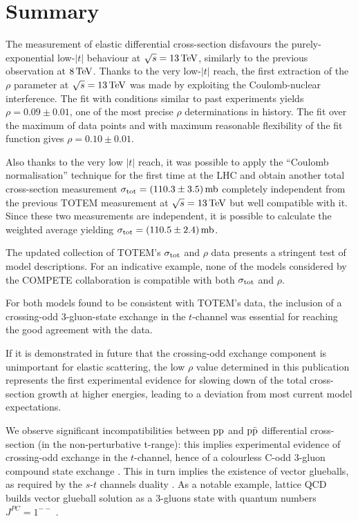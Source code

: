 \section{Summary}
\label{sec:summary}

The measurement of elastic differential cross-section disfavours the purely-exponential low-$|t|$ behaviour at $\sqrt s = 13\,{\rm TeV}$, similarly to the previous observation at $8\,{\rm TeV}$. Thanks to the very low-$|t|$ reach, the first extraction of the $\rho$ parameter at $\sqrt s = 13\,{\rm TeV}$ was made by exploiting the Coulomb-nuclear interference. The fit with conditions similar to past experiments yields $\rho = 0.09 \pm 0.01$, one of the most precise $\rho$ determinations in history. The fit over the maximum of data points and with maximum reasonable flexibility of the fit function gives $\rho = 0.10 \pm 0.01$.

Also thanks to the very low $|t|$ reach, it was possible to apply the ``Coulomb normalisation'' technique for the first time at the LHC and obtain another total cross-section measurement $\sigma_{\rm tot} = (110.3 \pm 3.5)\,{\rm mb}$ completely independent from the previous TOTEM measurement at $\sqrt s = 13\,{\rm TeV}$ \cite{totem-13tev-90m} but well compatible with it. Since these two measurements are independent, it is possible to calculate the weighted average yielding $\sigma_{\rm tot} = (110.5 \pm 2.4)\,{\rm mb}$.

The updated collection of TOTEM's $\sigma_{\rm tot}$ and $\rho$ data presents a stringent test of model descriptions. For an indicative example, none of the models considered by the COMPETE collaboration is compatible with both $\sigma_{\rm tot}$ and $\rho$.

For both models found to be consistent with TOTEM's data, the inclusion of a crossing-odd 3-gluon-state exchange in the $t$-channel was essential for reaching the good agreement with the data.

If it is demonstrated in future that the crossing-odd exchange component is unimportant for elastic scattering, the low $\rho$ value determined in this publication represents the first experimental evidence for slowing down of the total cross-section growth at higher energies, leading to a deviation from most current model expectations.

We observe significant incompatibilities between $\rm pp$ and $\rm p \bar p$ differential cross-section (in the non-perturbative t-range): this implies experimental evidence of crossing-odd exchange in the $t$-channel, hence of a colourless C-odd 3-gluon compound state exchange \cite{bartels-2000,bartels-2001}. This in turn implies the existence of vector glueballs, as required by the $s$-$t$ channels duality \cite{veneziano-1968}. As a notable example, lattice QCD builds vector glueball solution as a 3-gluons state with quantum numbers $J^{PC} = 1^{--}$ \cite{chen-2006}.
